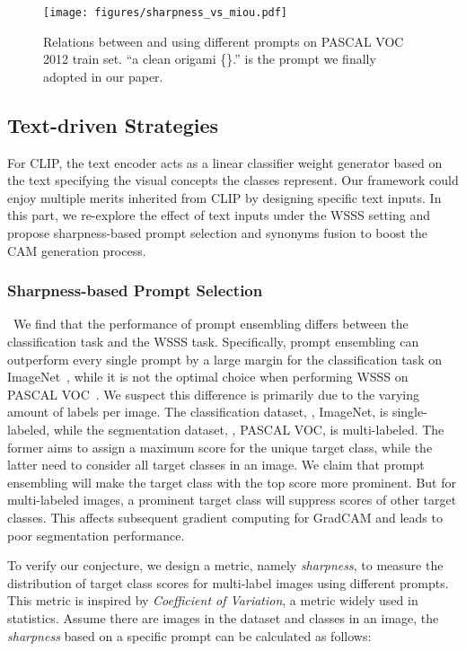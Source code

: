 \documentclass[10pt,twocolumn,letterpaper]{article}
\begin{document}
\begin{figure}[t]
  \centering
   \texttt{[image: figures/sharpness\_vs\_miou.pdf]}
    \vspace{-2mm}
   \caption{Relations between  and  using different prompts on PASCAL VOC 2012 train set. ``a clean origami \{\}.'' is the prompt we finally adopted in our paper. }
   \vspace{-2mm}
   \label{fig:sharpness vs miou}
\end{figure}


\subsection{Text-driven Strategies}
For CLIP, the text encoder acts as a linear classifier weight generator based on the text specifying the visual concepts the classes represent. Our framework could enjoy multiple merits inherited from CLIP by designing specific text inputs.  
In this part, we re-explore the effect of text inputs under the WSSS setting and propose sharpness-based prompt selection and synonyms fusion to boost the CAM generation process.
\vspace{-2mm}
\subsubsection{Sharpness-based Prompt Selection}
\ 
\indent We find that the performance of prompt ensembling differs between the classification task and the WSSS task. Specifically, prompt ensembling can outperform every single prompt by a large margin for the classification task on ImageNet~\cite{deng2009imagenet}, while it is not the optimal choice when performing WSSS on PASCAL VOC~\cite{everingham2010pascal}.
We suspect this difference is primarily due to the varying amount of labels per image.
The classification dataset, \eg, ImageNet, is single-labeled, while the segmentation dataset, \eg, PASCAL VOC, is multi-labeled. The former aims to assign a maximum score for the unique target class, while the latter need to consider all target classes in an image. We claim that prompt ensembling will make the target class with the top score more prominent. 
But for multi-labeled images, a prominent target class will suppress scores of other target classes. This affects subsequent gradient computing for GradCAM and leads to poor segmentation performance. 

To verify our conjecture, we design a metric, namely \textit{sharpness}, to measure the distribution of target class scores for multi-label images using different prompts. This metric is inspired by \textit{Coefficient of Variation}, a metric widely used in statistics. Assume there are  images in the dataset and  classes in an image, the \textit{sharpness} based on a specific prompt can be calculated as follows:
 
\end{document}
